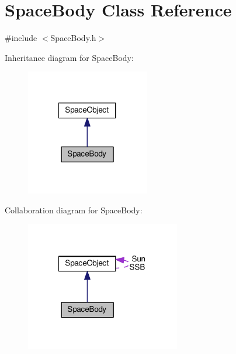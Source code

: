 \hypertarget{class_space_body}{\section{Space\+Body Class Reference}
\label{class_space_body}
}


{\ttfamily \#include $<$Space\+Body.\+h$>$}



Inheritance diagram for Space\+Body\+:\nopagebreak
\begin{figure}[H]
\begin{center}
\leavevmode
\includegraphics[width=152pt]{class_space_body__inherit__graph}
\end{center}
\end{figure}


Collaboration diagram for Space\+Body\+:\nopagebreak
\begin{figure}[H]
\begin{center}
\leavevmode
\includegraphics[width=191pt]{class_space_body__coll__graph}
\end{center}
\end{figure}
